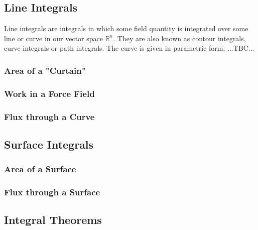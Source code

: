 \subsection{Line Integrals}
Line integrals are integrals in which some field quantity is integrated over some line or curve in our vector space $\mathbb{R}^n$. They are also known as contour integrals, curve integrals or path integrals. The curve is given in parametric form:
...TBC...

\subsubsection{Area of a "Curtain"}



\subsubsection{Work in a Force Field}


\subsubsection{Flux through a Curve}



\subsection{Surface Integrals}
\subsubsection{Area of a Surface}
\subsubsection{Flux through a Surface}

\subsection{Integral Theorems}

